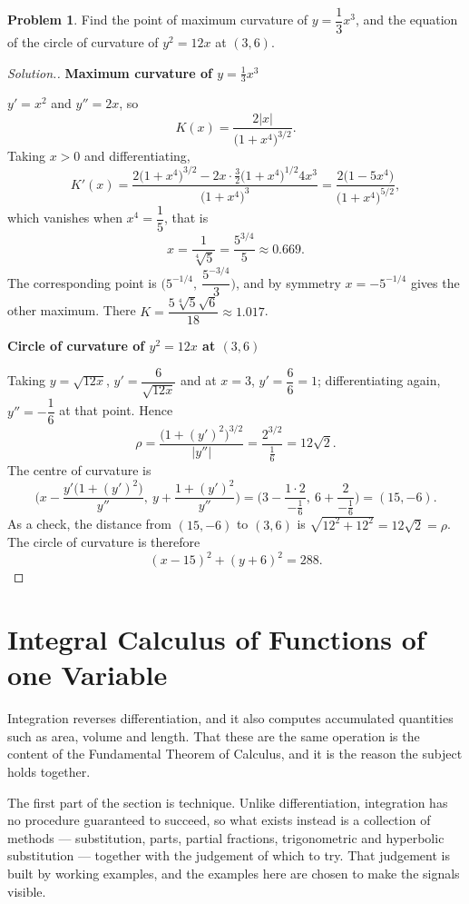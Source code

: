 \documentclass[11pt,a4paper]{article}
\theoremstyle{definition}
\newtheorem{problemx}{Problem}[subsection]
\newenvironment{problem}{\begin{problemx}}{\end{problemx}}
\newenvironment{solution}
  {\renewcommand{\qedsymbol}{}\begin{proof}[\textit{Solution}.]}
  {\end{proof}}
\newcommand{\subhead}[1]{%
  \par\medskip\noindent\textbf{#1}\par\nobreak\smallskip}
\begin{document}
\begin{problem}
Find the point of maximum curvature of $y = \dfrac13x^3$, and the equation of
the circle of curvature of $y^2 = 12x$ at $(3,6)$.
\end{problem}
\begin{solution}
\subhead{Maximum curvature of $y = \frac13x^3$}
$y' = x^2$ and $y'' = 2x$, so
$$K(x) = \frac{2\left|x\right|}{\big(1+x^4\big)^{3/2}} .$$
Taking $x>0$ and differentiating,
$$K'(x) = \frac{2\big(1+x^4\big)^{3/2} - 2x\cdot\frac32\big(1+x^4\big)^{1/2}4x^3}
{\big(1+x^4\big)^3}
= \frac{2\big(1 - 5x^4\big)}{\big(1+x^4\big)^{5/2}} ,$$
which vanishes when $x^4 = \dfrac15$, that is
$$x = \frac{1}{\sqrt[4]{5}} = \frac{5^{3/4}}{5}\approx 0.669 .$$
The corresponding point is $\Big(5^{-1/4},\ \dfrac{5^{-3/4}}{3}\Big)$, and by
symmetry $x = -5^{-1/4}$ gives the other maximum. There
$K = \dfrac{5\sqrt[4]{5}\sqrt6}{18}\approx 1.017$.

\subhead{Circle of curvature of $y^2 = 12x$ at $(3,6)$}
Taking $y = \sqrt{12x}$, $y' = \dfrac{6}{\sqrt{12x}}$ and at $x=3$,
$y' = \dfrac{6}{6} = 1$; differentiating again, $y'' = -\dfrac16$ at that point.
Hence
$$\rho = \frac{\big(1+(y')^2\big)^{3/2}}{\left|y''\right|}
= \frac{2^{3/2}}{\frac16} = 12\sqrt2 .$$
The centre of curvature is
$$\Big(x - \frac{y'\big(1+(y')^2\big)}{y''},\ y + \frac{1+(y')^2}{y''}\Big)
= \Big(3 - \frac{1\cdot 2}{-\frac16},\ 6 + \frac{2}{-\frac16}\Big)
= (15, -6).$$
As a check, the distance from $(15,-6)$ to $(3,6)$ is
$\sqrt{12^2+12^2} = 12\sqrt2 = \rho$. The circle of curvature is therefore
$$(x-15)^2 + (y+6)^2 = 288 .$$
\end{solution}




\section{Integral Calculus of Functions of one Variable}

Integration reverses differentiation, and it also computes accumulated
quantities such as area, volume and length. That these are the same operation is
the content of the Fundamental Theorem of Calculus, and it is the reason the
subject holds together.

The first part of the section is technique. Unlike differentiation, integration
has no procedure guaranteed to succeed, so what exists instead is a collection
of methods --- substitution, parts, partial fractions, trigonometric and
hyperbolic substitution --- together with the judgement of which to try. That
judgement is built by working examples, and the examples here are chosen to make
the signals visible.
\end{document}
